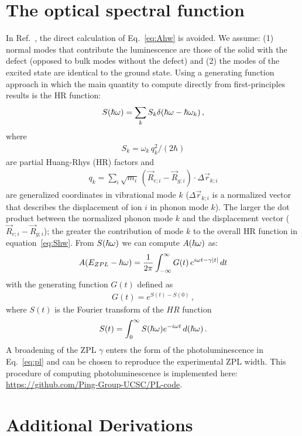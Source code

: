 \section{The optical spectral function}
In Ref.~\cite{alkauskas2014first1}, the direct calculation of Eq.~\ref{eq:Ahw} is avoided. We assume: (1) normal modes that contribute the luminescence are those of the solid with the defect (opposed to bulk modes without the defect) and (2) the modes of the excited state are identical to the ground state. Using a generating function approach in which the main quantity to compute directly from first-principles results is the HR function:
\begin{align}
    S(\hbar\omega) = \sum_k S_k \delta(\hbar\omega - \hbar\omega_k)\, ,
    \label{eq:Shw}
\end{align}
where
\begin{align}
    S_k = \omega_k \, q_k^2 /(2\hbar)
\end{align}
are partial Huang-Rhys (HR) factors and
\begin{align}
    q_k = \sum_i \sqrt{m_i} \, (\vec{R}_{e;i} - \vec{R}_{g;i}) \cdot \Delta \vec{r}_{k;i}
\end{align}
are generalized coordinates in vibrational mode $k$ ($\Delta \vec{r}_{k;i}$ is a normalized vector that describes the displacement of ion $i$ in phonon mode $k$). The larger the dot product between the normalized phonon mode $k$ and the displacement vector ($\vec{R}_{e;i} - \vec{R}_{g;i}$); the greater the contribution of mode $k$ to the overall HR function in equation~\ref{eq:Shw}. From $S(\hbar\omega)$ we can compute $A(\hbar\omega)$ as:
\begin{align}
    A(E_{ZPL} - \hbar\omega) = \frac{1}{2\pi} \int_{-\infty}^{\infty}
        G(t)\, e^{i\omega t -\gamma |t|} \, dt
    \label{eq:pl}
\end{align}
with the generating function $G(t)$ defined as
\begin{align}
    G(t) = e^{S(t) - S(0)}\, ,
\end{align}
where $S(t)$ is the Fourier transform of the $HR$ function
\begin{align}
    S(t) = \int_{0}^{\infty} S(\hbar\omega) e^{-i\omega t} \, d(\hbar\omega)\, .
\end{align}
A broadening of the ZPL $\gamma$ enters the form of the photoluminescence in Eq.~\ref{eq:pl} and can be chosen to reproduce the experimental ZPL width.
This procedure of computing photoluminescence is implemented here: \url{https://github.com/Ping-Group-UCSC/PL-code}.


\section{Additional Derivations}

